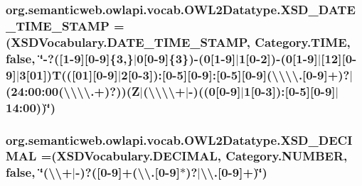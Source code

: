 \hypertarget{enumorg_1_1semanticweb_1_1owlapi_1_1vocab_1_1_o_w_l2_datatype_ada5811e8b1e61f35fbf3c253e7aadbd3}{
\subsubsection[{X\-S\-D\-\_\-\-D\-A\-T\-E\-\_\-\-T\-I\-M\-E\-\_\-\-S\-T\-A\-M\-P}]{\setlength{\rightskip}{0pt plus 5cm}org.\-semanticweb.\-owlapi.\-vocab.\-O\-W\-L2\-Datatype.\-X\-S\-D\-\_\-\-D\-A\-T\-E\-\_\-\-T\-I\-M\-E\-\_\-\-S\-T\-A\-M\-P =({\bf X\-S\-D\-Vocabulary.\-D\-A\-T\-E\-\_\-\-T\-I\-M\-E\-\_\-\-S\-T\-A\-M\-P}, {\bf Category.\-T\-I\-M\-E}, false, \char`\"{}-\/?(\mbox{[}1-\/9\mbox{]}\mbox{[}0-\/9\mbox{]}\{3,\}$|$0\mbox{[}0-\/9\mbox{]}\{3\})-\/(0\mbox{[}1-\/9\mbox{]}$|$1\mbox{[}0-\/2\mbox{]})-\/(0\mbox{[}1-\/9\mbox{]}$|$\mbox{[}12\mbox{]}\mbox{[}0-\/9\mbox{]}$|$3\mbox{[}01\mbox{]})T((\mbox{[}01\mbox{]}\mbox{[}0-\/9\mbox{]}$|$2\mbox{[}0-\/3\mbox{]})\-:\mbox{[}0-\/5\mbox{]}\mbox{[}0-\/9\mbox{]}\-:\mbox{[}0-\/5\mbox{]}\mbox{[}0-\/9\mbox{]}(\textbackslash{}\textbackslash{}\textbackslash{}\textbackslash{}.\mbox{[}0-\/9\mbox{]}+)?$|$(24\-:00\-:00(\textbackslash{}\textbackslash{}\textbackslash{}\textbackslash{}.+)?))(Z$|$(\textbackslash{}\textbackslash{}\textbackslash{}\textbackslash{}+$|$-\/)((0\mbox{[}0-\/9\mbox{]}$|$1\mbox{[}0-\/3\mbox{]})\-:\mbox{[}0-\/5\mbox{]}\mbox{[}0-\/9\mbox{]}$|$14\-:00))\char`\"{})}}\label{enumorg_1_1semanticweb_1_1owlapi_1_1vocab_1_1_o_w_l2_datatype_ada5811e8b1e61f35fbf3c253e7aadbd3}
\hypertarget{enumorg_1_1semanticweb_1_1owlapi_1_1vocab_1_1_o_w_l2_datatype_a3019a80060958588d9bb648054c395f1}{
\subsubsection[{X\-S\-D\-\_\-\-D\-E\-C\-I\-M\-A\-L}]{\setlength{\rightskip}{0pt plus 5cm}org.\-semanticweb.\-owlapi.\-vocab.\-O\-W\-L2\-Datatype.\-X\-S\-D\-\_\-\-D\-E\-C\-I\-M\-A\-L =({\bf X\-S\-D\-Vocabulary.\-D\-E\-C\-I\-M\-A\-L}, {\bf Category.\-N\-U\-M\-B\-E\-R}, false, \char`\"{}(\textbackslash{}\textbackslash{}+$|$-\/)?(\mbox{[}0-\/9\mbox{]}+(\textbackslash{}\textbackslash{}.\mbox{[}0-\/9\mbox{]}$\ast$)?$|$\textbackslash{}\textbackslash{}.\mbox{[}0-\/9\mbox{]}+)\char`\"{})}}\label{enumorg_1_1semanticweb_1_1owlapi_1_1vocab_1_1_o_w_l2_datatype_a3019a80060958588d9bb648054c395f1}
